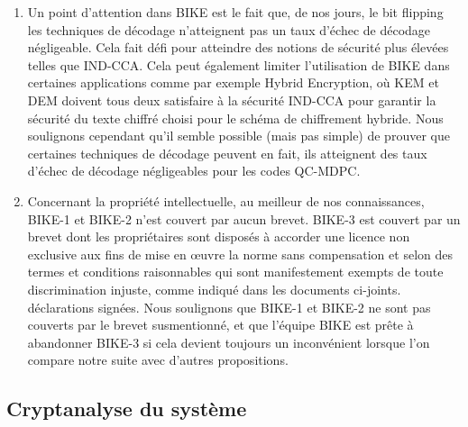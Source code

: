 \documentclass[12pt,openany]{report}
\begin{document}
\begin{enumerate}



\item Un point d'attention dans BIKE est le fait que, de nos jours, le bit flipping
les techniques de décodage n'atteignent pas un taux d'échec de décodage négligeable. Cela fait
défi pour atteindre des notions de sécurité plus élevées telles que IND-CCA. Cela peut également limiter
l'utilisation de BIKE dans certaines applications comme par exemple Hybrid Encryption,
où KEM et DEM doivent tous deux satisfaire à la sécurité IND-CCA pour garantir la sécurité du texte chiffré choisi pour le schéma de chiffrement hybride. Nous soulignons cependant qu'il
semble possible (mais pas simple) de prouver que certaines techniques de décodage peuvent
en fait, ils atteignent des taux d'échec de décodage négligeables pour les codes QC-MDPC.

\item Concernant la propriété intellectuelle, au meilleur de nos connaissances, BIKE-1 et
BIKE-2 n’est couvert par aucun brevet. BIKE-3 est couvert par un brevet dont
les propriétaires sont disposés à accorder une licence non exclusive aux fins de mise en œuvre
la norme sans compensation et selon des termes et conditions raisonnables qui
sont manifestement exempts de toute discrimination injuste, comme indiqué dans les documents ci-joints.
déclarations signées. Nous soulignons que BIKE-1 et BIKE-2 ne sont pas couverts par
le brevet susmentionné, et que l'équipe BIKE est prête à abandonner BIKE-3 si
cela devient toujours un inconvénient lorsque l'on compare notre suite avec d'autres propositions.

\end{enumerate}

\subsection{Cryptanalyse du système}
\end{document}

